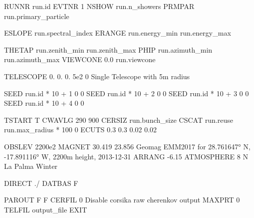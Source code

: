 RUNNR    {{ run.id }}
EVTNR    1
NSHOW    {{ run.n_showers }}
PRMPAR   {{ run.primary_particle }}

ESLOPE  {{ run.spectral_index }}
ERANGE  {{ run.energy_min }} {{ run.energy_max }}

THETAP  {{ run.zenith_min }} {{ run.zenith_max }}
PHIP    {{ run.azimuth_min }} {{ run.azimuth_max }}
VIEWCONE 0.0 {{ run.viewcone }}

TELESCOPE  0. 0. 0. 5e2 0         Single Telescope with 5m radius

SEED {{ run.id * 10 + 1 }} 0 0
SEED {{ run.id * 10 + 2 }} 0 0
SEED {{ run.id * 10 + 3 }} 0 0
SEED {{ run.id * 10 + 4 }} 0 0

TSTART T
CWAVLG 290 900
CERSIZ {{ run.bunch_size }}                          
CSCAT {{ run.reuse }} {{ run.max_radius * 100 }} 0
ECUTS 0.3 0.3 0.02 0.02           

OBSLEV 2200e2
MAGNET 30.419 23.856             Geomag EMM2017 for 28.761647° N, -17.891116° W,
                                 2200m height, 2013-12-31
ARRANG -6.15
ATMOSPHERE 8 N                   La Palma Winter

DIRECT ./
DATBAS F

PAROUT F F
CERFIL 0                         Disable corsika raw cherenkov output
MAXPRT 0
TELFIL {{ output_file }}
EXIT
